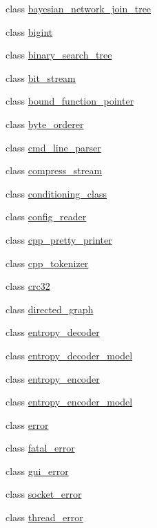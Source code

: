 \begin{DoxyCompactItemize}
\item 
class \hyperlink{classdlib_1_1bayesian__network__join__tree}{bayesian\_\-network\_\-join\_\-tree}
\item 
class \hyperlink{classdlib_1_1bigint}{bigint}
\item 
class \hyperlink{classdlib_1_1binary__search__tree}{binary\_\-search\_\-tree}
\item 
class \hyperlink{classdlib_1_1bit__stream}{bit\_\-stream}
\item 
class \hyperlink{classdlib_1_1bound__function__pointer}{bound\_\-function\_\-pointer}
\item 
class \hyperlink{classdlib_1_1byte__orderer}{byte\_\-orderer}
\item 
class \hyperlink{classdlib_1_1cmd__line__parser}{cmd\_\-line\_\-parser}
\item 
class \hyperlink{classdlib_1_1compress__stream}{compress\_\-stream}
\item 
class \hyperlink{classdlib_1_1conditioning__class}{conditioning\_\-class}
\item 
class \hyperlink{classdlib_1_1config__reader}{config\_\-reader}
\item 
class \hyperlink{classdlib_1_1cpp__pretty__printer}{cpp\_\-pretty\_\-printer}
\item 
class \hyperlink{classdlib_1_1cpp__tokenizer}{cpp\_\-tokenizer}
\item 
class \hyperlink{classdlib_1_1crc32}{crc32}
\item 
class \hyperlink{classdlib_1_1directed__graph}{directed\_\-graph}
\item 
class \hyperlink{classdlib_1_1entropy__decoder}{entropy\_\-decoder}
\item 
class \hyperlink{classdlib_1_1entropy__decoder__model}{entropy\_\-decoder\_\-model}
\item 
class \hyperlink{classdlib_1_1entropy__encoder}{entropy\_\-encoder}
\item 
class \hyperlink{classdlib_1_1entropy__encoder__model}{entropy\_\-encoder\_\-model}
\item 
class \hyperlink{classdlib_1_1error}{error}
\item 
class \hyperlink{classdlib_1_1fatal__error}{fatal\_\-error}
\item 
class \hyperlink{classdlib_1_1gui__error}{gui\_\-error}
\item 
class \hyperlink{classdlib_1_1socket__error}{socket\_\-error}
\item 
class \hyperlink{classdlib_1_1thread__error}{thread\_\-error}

\end{DoxyCompactItemize}
